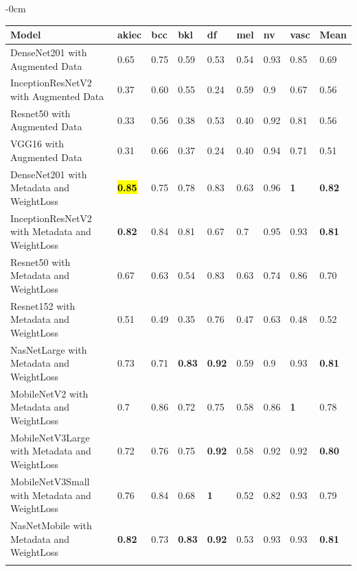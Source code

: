 \documentclass[sensors,article,accept,pdftex,moreauthors]{Definitions/mdpi}
\begin{document}
\begin{table}[H]
\begin{adjustwidth}{-\extralength}{0cm}
	\begin{tabular}{|l|l|l|l|l|l|l|l|l|}  
		\noalign{\hrule height 1pt}
		\textbf{Model} & \textbf{akiec} & \textbf{bcc} & \textbf{bkl} & \textbf{df} & \textbf{mel} & \textbf{nv} & \textbf{vasc} & \textbf{Mean} \\
		\hline
		DenseNet201 with Augmented Data & 0.65 & 0.75 & 0.59 & 0.53 & 0.54 & 0.93 & 0.85 & 0.69\\ 
		\hline
		InceptionResNetV2 with Augmented Data & 0.37 & 0.60 & 0.55 & 0.24 & 0.59 & 0.9 & 0.67 & 0.56\\
		\hline
		Resnet50 with Augmented Data & 0.33 & 0.56 & 0.38 & 0.53 & 0.40 & 0.92 & 0.81 & 0.56\\
		\hline 	
		VGG16 with Augmented Data & 0.31 & 0.66 & 0.37 & 0.24 & 0.40 & 0.94 & 0.71 & 0.51\\ 
		\hline		
		DenseNet201 with Metadata and WeightLoss & \textbf{\hl{0.85} %
} & 0.75 & 0.78 & 0.83 & 0.63 & 0.96 & \textbf{1} & \textbf{0.82}\\
		\hline
		InceptionResNetV2 with Metadata and WeightLoss & \textbf{0.82} & 0.84 & 0.81 & 0.67 & 0.7 & 0.95 & 0.93 & \textbf{0.81}\\
		\hline
		Resnet50 with Metadata and WeightLoss & 0.67 & 0.63 & 0.54 & 0.83 & 0.63 & 0.74 & 0.86 & 0.70\\
		\hline
		Resnet152 with Metadata and WeightLoss & 0.51 & 0.49 & 0.35 & 0.76 & 0.47 & 0.63 & 0.48 & 0.52\\
		\hline
		NasNetLarge with Metadata and WeightLoss & 0.73 & 0.71 & \textbf{0.83} & \textbf{0.92} & 0.59 & 0.9 & 0.93 & \textbf{0.81}\\
		\hline
		MobileNetV2 with Metadata and WeightLoss & 0.7 & 0.86 & 0.72 & 0.75 & 0.58 & 0.86 & \textbf{1} & 0.78\\
		\hline
		MobileNetV3Large with Metadata and WeightLoss & 0.72 & 0.76 & 0.75 & \textbf{0.92} & 0.58 & 0.92 & 0.92 & \textbf{0.80}\\
		\hline
		MobileNetV3Small with Metadata and WeightLoss & 0.76 & 0.84 & 0.68 & \textbf{1} & 0.52 & 0.82 & 0.93 & 0.79\\
		\hline
		NasNetMobile with Metadata and WeightLoss & \textbf{0.82} & 0.73 & \textbf{0.83} & \textbf{0.92} & 0.53 & 0.93 & 0.93 & \textbf{0.81}\\
		\noalign{\hrule height 1pt}
	\end{tabular}
\end{adjustwidth}
\end{table}
\end{document}
